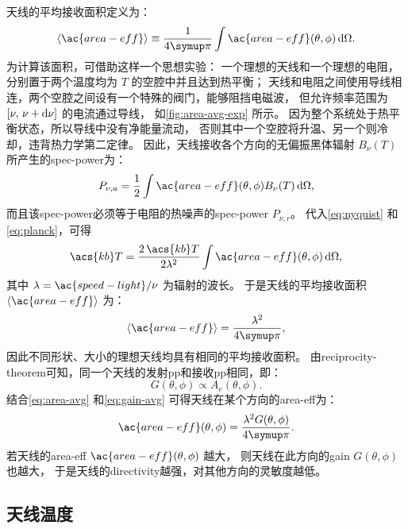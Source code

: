 天线的平均接收面积定义为：
\begin{equation}
  \label{eq:area-avg1}
  \langle \ac{area-eff} \rangle
    \equiv \frac{1}{4\Cpi} \int \ac{area-eff}(\theta,\phi) \,\D{\Omega} .
\end{equation}
为计算该面积，可借助这样一个思想实验：
一个理想的天线和一个理想的电阻，分别置于两个温度均为 $T$ 的空腔中并且达到热平衡；
天线和电阻之间使用导线相连，两个空腔之间设有一个特殊的阀门，能够阻挡电磁波，
但允许频率范围为 $[\nu, \,\nu+\mathrm{d}\nu]$ 的电流通过导线，
如\autoref{fig:area-avg-exp} 所示。
因为整个系统处于热平衡状态，所以导线中没有净能量流动，
否则其中一个空腔将升温、另一个则冷却，违背热力学第二定律。
因此，天线接收各个方向的无偏振黑体辐射 $B_{\nu}(T)$ 所产生的\ac{spec-power}为：
\begin{equation}
  P_{\nu,a} =
    \frac{1}{2} \int \ac{area-eff}(\theta,\phi) B_{\nu}(T) \,\D{\Omega} ,
\end{equation}
而且该\ac{spec-power}必须等于电阻的热噪声的\ac{spec-power} $P_{\nu,r}$。
代入\autoref{eq:nyquist} 和\autoref{eq:planck}，可得
\begin{equation}
  \acs{kb}T =
    \frac{2\,\acs{kb}T}{2\lambda^2}
      \int \ac{area-eff}(\theta,\phi) \,\D{\Omega} ,
\end{equation}
其中 $\lambda = \ac{speed-light} / \nu$ 为辐射的波长。
于是天线的平均接收面积 $\langle \ac{area-eff} \rangle$ 为：
\begin{equation}
  \label{eq:area-avg}
  \langle \ac{area-eff} \rangle = \frac{\lambda^2}{4\Cpi} ,
\end{equation}
因此不同形状、大小的理想天线均具有相同的平均接收面积。
由\ac{reciprocity-theorem}可知，同一个天线的发射\ac{pp}和接收\ac{pp}相同，即：
\begin{equation}
  G(\theta,\phi) \propto A_e(\theta,\phi) .
\end{equation}
结合\autoref{eq:area-avg} 和\autoref{eq:gain-avg}
可得天线在某个方向的\acl{area-eff}为：
\begin{equation}
  \ac{area-eff}(\theta,\phi) = \frac{\lambda^2 G(\theta,\phi)}{4\Cpi} .
\end{equation}
若天线的\acl{area-eff} $\ac{area-eff}(\theta,\phi)$ 越大，
则天线在此方向的\ac{gain} $G(\theta,\phi)$ 也越大，
于是天线的\ac{directivity}越强，对其他方向的灵敏度越低。

\subsection{天线温度}

